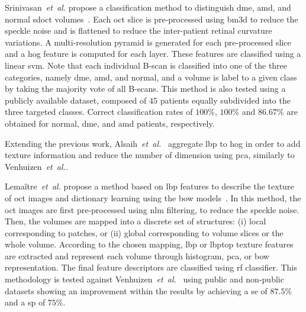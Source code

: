 %
Srinivasan~\textit{et~al.} propose a classification method to distinguish \gls{dme}, \gls{amd}, and normal \gls{sdoct} volumes~\cite{Srinivasan2014}.
%
Each \gls{oct} slice is pre-processed using \gls{bm3d} to reduce the speckle noise and is flattened to reduce the inter-patient retinal curvature variations.
A multi-resolution pyramid is generated for each pre-processed slice and a \gls{hog} feature is computed for each layer.
These features are classified using a linear \gls{svm}.
Note that each individual B-scan is classified into one of the three categories, namely \gls{dme}, \gls{amd}, and normal, and a volume is label to a given class by taking the majority vote of all B-scans.
%
This method is also tested using a publicly available dataset, composed of $45$ patients equally subdivided into the three targeted classes.
Correct classification rates of $100 \%$, $100 \%$ and $86.67 \%$ are obtained for normal, \gls{dme}, and \gls{amd} patients, respectively.

Extending the previous work, Alsaih~\emph{et~al.}~\cite{Alsaih2016apr-repoICPR} aggregate \gls{lbp} to \gls{hog} in order to add texture information and reduce the number of dimension using \gls{pca}, similarly to Venhuizen~\textit{et~al.}.

Lema\^itre~\emph{et~al.} propose a method based on \gls{lbp} features to describe the texture of \gls{oct} images and dictionary learning using the \gls{bow} models~\cite{Lemaintre2015miccaiOCT}.
In this method, the \gls{oct} images are first pre-processed using \gls{nlm} filtering, to reduce the speckle noise.
Then, the volumes are mapped into a discrete set of structures: (i) local corresponding to patches, or (ii) global corresponding to volume slices or the whole volume.
According to the chosen mapping, \gls{lbp} or \gls{lbptop} texture features are extracted and represent each volume through histogram, \gls{pca}, or \gls{bow} representation.
The final feature descriptors are classified using \gls{rf} classifier.
This methodology is tested against Venhuizen~\textit{et~al.}~\cite{Venhuizen2015} using public and non-public datasets showing an improvement within the results by achieving a \gls{se} of $87.5 \%$ and a \gls{sp} of $75 \%$.

